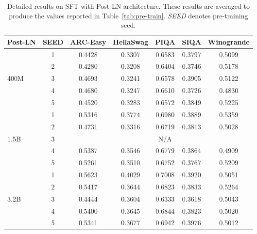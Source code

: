 \begin{table}
\vskip -0.1in
\small
    \centering
    \caption{Detailed results on SFT with Post-LN architecture. These results are averaged to produce the values reported in Table~\ref{tab:pre-train}. \textit{SEED} denotes pre-training seed.}
    \begin{tabular}{lcccccc}
        \toprule
        Post-LN & SEED & ARC-Easy & HellaSwag & PIQA & SIQA & Winogrande \\ 
        \toprule
        ~ & 1 & 0.4428 & 0.3307 & 0.6583 & 0.3797 & 0.5099 \\
        ~ & 2 & 0.4280 & 0.3208 & 0.6404 & 0.3746 & 0.5178 \\ 
        400M & 3 & 0.4693 & 0.3241 & 0.6578 & 0.3905 & 0.5122 \\ 
        ~ & 4 & 0.4680 & 0.3247 & 0.6610 & 0.3726 & 0.4830 \\ 
        ~ & 5 & 0.4520 & 0.3283 & 0.6572 & 0.3849 & 0.5225 \\ 
        \midrule
        ~ & 1 & 0.5316 & 0.3774 & 0.6980 & 0.3889 & 0.5359 \\
        ~ & 2 & 0.4731 & 0.3316 & 0.6719 & 0.3813 & 0.5028 \\ 
        1.5B & 3 & ~ & ~ & N/A & ~ & ~ \\ 
        ~ & 4 & 0.5387 & 0.3546 & 0.6779 & 0.3864 & 0.4909 \\ 
        ~ & 5 & 0.5261 & 0.3510 & 0.6752 & 0.3767 & 0.5209 \\ 
        \midrule
        ~ & 1 & 0.5623 & 0.4029 & 0.7008 & 0.3920 & 0.5051 \\
        ~ & 2 & 0.5417 & 0.3644 & 0.6823 & 0.3833 & 0.5264 \\ 
        3.2B & 3 & 0.4444 & 0.3604 & 0.6333 & 0.3618 & 0.5043 \\ 
        ~ & 4 & 0.5400 & 0.3645 & 0.6844 & 0.3823 & 0.5020 \\ 
        ~ & 5 & 0.5341 & 0.3677 & 0.6942 & 0.3976 & 0.5012 \\ 
        \bottomrule
    \end{tabular}
    \vskip -0.1in
\end{table}



